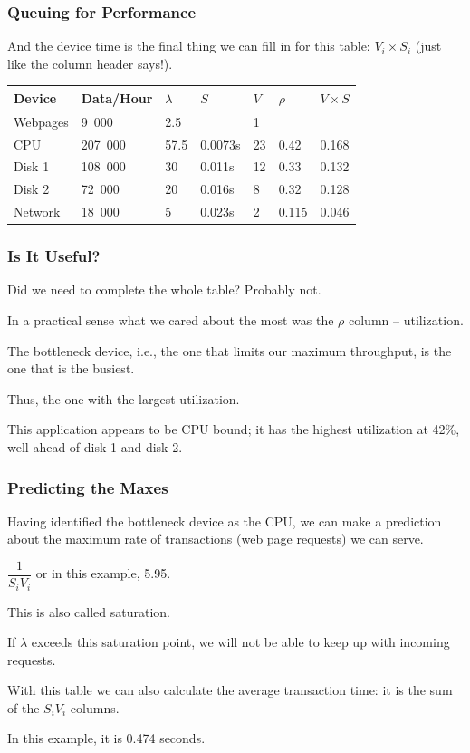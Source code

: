 \begin{frame}
\frametitle{Queuing for Performance}

And the device time is the final thing we can fill in for this table: $V_{i} \times S_{i}$ (just like the column header says!).

\begin{center}
\begin{tabular}{|l|l|l|l|l|l|l|} \hline
	\textbf{Device} & \textbf{Data/Hour} & \textbf{$\lambda$} & \textbf{$S$} & \textbf{$V$} & \textbf{$\rho$} & \textbf{$V \times S$} \\ \hline
	Webpages & 9~000 & 2.5 & & 1 & & \\ \hline
	CPU & 207~000 & 57.5 & 0.0073s & 23 & 0.42 & 0.168\\ \hline
	Disk 1 & 108~000 & 30 & 0.011s  & 12& 0.33 & 0.132\\ \hline
	Disk 2 & 72~000 & 20 & 0.016s & 8 & 0.32 & 0.128\\ \hline
	Network & 18~000 & 5 & 0.023s & 2 & 0.115 & 0.046\\ \hline
\end{tabular}
\end{center}

\end{frame}



\begin{frame}
\frametitle{Is It Useful?}

Did we need to complete the whole table? Probably not. 

In a practical sense what we cared about the most was the $\rho$ column -- utilization. 

The bottleneck device, i.e., the one that limits our maximum throughput, is the one that is the busiest. 

Thus, the one with the largest utilization. 

This application appears to be CPU bound; it has the highest utilization at 42\%, well ahead of disk 1 and disk 2. 

\end{frame}



\begin{frame}
\frametitle{Predicting the Maxes}

Having identified the bottleneck device as the CPU, we can make a prediction about the maximum rate of transactions (web page requests) we can serve. 

$\dfrac{1}{S_{i}V_{i}}$ or in this example, 5.95. 

This is also called saturation.

 If $\lambda$ exceeds this saturation point, we will not be able to keep up with incoming requests.

With this table we can also calculate the average transaction time: it is the sum of the $S_{i}V_{i}$ columns. 

In this example, it is 0.474 seconds. 


\end{frame}



